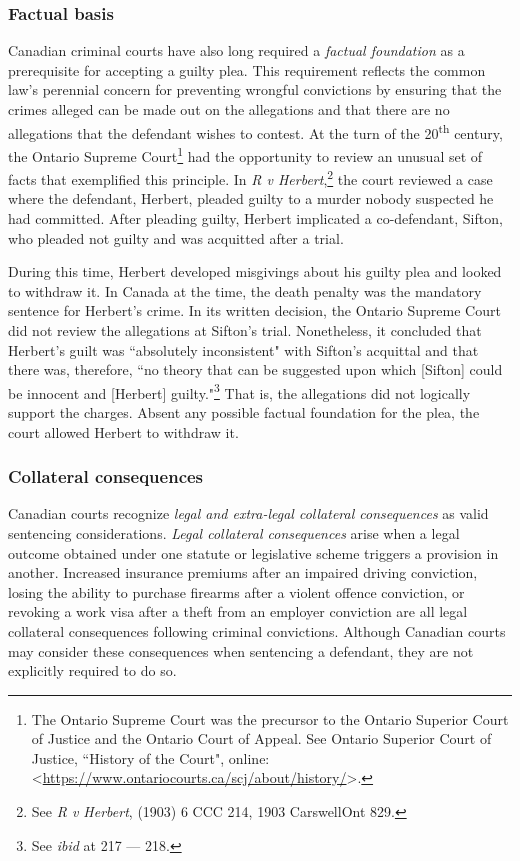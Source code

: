 \subsubsection{Factual basis}

Canadian criminal courts have also long required a \textit{factual foundation} as a prerequisite for accepting a guilty plea. This requirement reflects the common law's perennial concern for preventing wrongful convictions by ensuring that the crimes alleged can be made out on the allegations and that there are no allegations that the defendant wishes to contest. At the turn of the 20\textsuperscript{th} century, the Ontario Supreme Court\footnote{The Ontario Supreme Court was the precursor to the Ontario Superior Court of Justice and the Ontario Court of Appeal. See Ontario Superior Court of Justice, ``History of the Court", online: \textless \url{https://www.ontariocourts.ca/scj/about/history/}\textgreater.} had the opportunity to review an unusual set of facts that exemplified this principle. In \textit{R v Herbert},\footnote{See \textit{R v Herbert}, (1903) 6 CCC 214, 1903 CarswellOnt 829.} the court reviewed a case where the defendant, Herbert, pleaded guilty to a murder nobody suspected he had committed. After pleading guilty, Herbert implicated a co-defendant, Sifton, who pleaded not guilty and was acquitted after a trial. 

During this time, Herbert developed misgivings about his guilty plea and looked to withdraw it. In Canada at the time, the death penalty was the mandatory sentence for Herbert's crime. In its written decision, the Ontario Supreme Court did not review the allegations at Sifton's trial. Nonetheless, it concluded that Herbert's guilt was ``absolutely inconsistent" with Sifton's acquittal and that there was, therefore, ``no theory that can be suggested upon which [Sifton] could be innocent and [Herbert] guilty."\footnote{See \textit{ibid} at 217 — 218.} That is, the allegations did not logically support the charges. Absent any possible factual foundation for the plea, the court allowed Herbert to withdraw it.

\subsubsection{Collateral consequences}

Canadian courts recognize \textit{legal and extra-legal collateral consequences} as valid sentencing considerations. \textit{Legal collateral consequences} arise when a legal outcome obtained under one statute or legislative scheme triggers a provision in another. Increased insurance premiums after an impaired driving conviction, losing the ability to purchase firearms after a violent offence conviction, or revoking a work visa after a theft from an employer conviction are all legal collateral consequences following criminal convictions. Although Canadian courts may consider these consequences when sentencing a defendant, they are not explicitly required to do so. 

